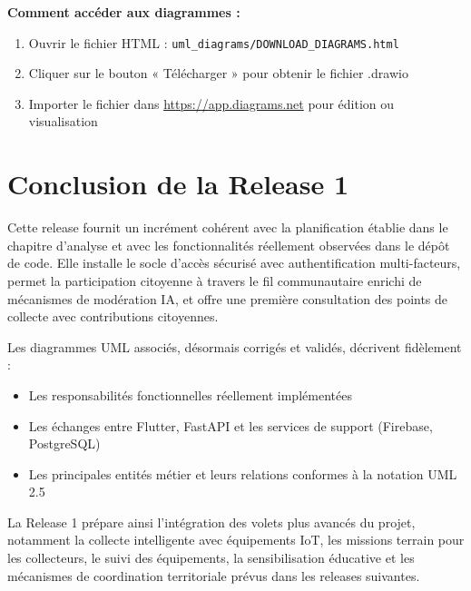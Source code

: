 \noindent\textbf{Comment accéder aux diagrammes :}
\begin{enumerate}
    \item Ouvrir le fichier HTML : \texttt{uml\_diagrams/DOWNLOAD\_DIAGRAMS.html}
    \item Cliquer sur le bouton « Télécharger » pour obtenir le fichier .drawio
    \item Importer le fichier dans \url{https://app.diagrams.net} pour édition ou visualisation
\end{enumerate}

\section{Conclusion de la Release 1}
\label{sec:r1_conclusion}

Cette release fournit un incrément cohérent avec la planification établie dans le chapitre d'analyse et avec les fonctionnalités réellement observées dans le dépôt de code. Elle installe le socle d'accès sécurisé avec authentification multi-facteurs, permet la participation citoyenne à travers le fil communautaire enrichi de mécanismes de modération IA, et offre une première consultation des points de collecte avec contributions citoyennes.

Les diagrammes UML associés, désormais corrigés et validés, décrivent fidèlement :
\begin{itemize}
    \item Les responsabilités fonctionnelles réellement implémentées
    \item Les échanges entre Flutter, FastAPI et les services de support (Firebase, PostgreSQL)
    \item Les principales entités métier et leurs relations conformes à la notation UML 2.5
\end{itemize}

La Release 1 prépare ainsi l'intégration des volets plus avancés du projet, notamment la collecte intelligente avec équipements IoT, les missions terrain pour les collecteurs, le suivi des équipements, la sensibilisation éducative et les mécanismes de coordination territoriale prévus dans les releases suivantes.
